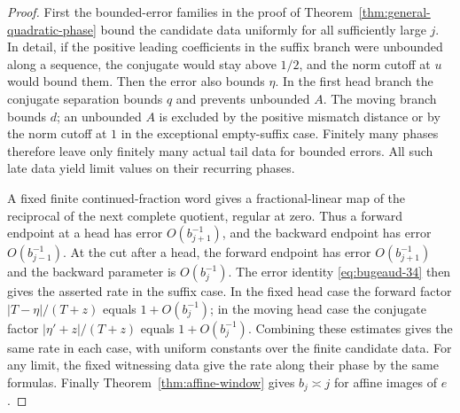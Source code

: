 \documentclass[11pt]{amsart}
\theoremstyle{definition}
\theoremstyle{remark}
\numberwithin{equation}{section}
\begin{document}
\begin{proof}
First the bounded-error families in the proof of
Theorem~\ref{thm:general-quadratic-phase} bound the candidate data
uniformly for all sufficiently large $j$. In detail, if the
positive leading coefficients in the suffix branch were unbounded
along a sequence, the conjugate would stay above $1/2$, and the
norm cutoff at $u$ would bound them. Then the error also bounds
$\eta$. In the first head branch the conjugate separation bounds
$q$ and prevents unbounded $A$. The moving branch bounds $d$;
an unbounded $A$ is excluded by the positive mismatch distance or
by the norm cutoff at $1$ in the exceptional empty-suffix case.
Finitely many phases therefore leave only finitely many actual
tail data for bounded errors. All such late data yield limit
values on their recurring phases.

A fixed finite continued-fraction word gives a fractional-linear
map of the reciprocal of the next complete quotient, regular at
zero. Thus a forward endpoint at a head has error
$O(b_{j+1}^{-1})$, and the backward endpoint has error
$O(b_{j-1}^{-1})$. At the cut after a head, the forward endpoint
has error $O(b_{j+1}^{-1})$ and the backward parameter is
$O(b_j^{-1})$. The error identity \eqref{eq:bugeaud-34}
then gives the asserted rate in the suffix case. In the fixed
head case the forward factor $|T-\eta|/(T+z)$ equals
$1+O(b_j^{-1})$; in the moving head case the conjugate factor
$|\eta'+z|/(T+z)$ equals $1+O(b_j^{-1})$. Combining these estimates
gives the same rate in each case, with uniform constants over the
finite candidate data. For any limit, the fixed witnessing data
give the rate along their phase by the same formulas.
Finally Theorem~\ref{thm:affine-window} gives $b_j\asymp j$
for affine images of $e$.
\end{proof}
\end{document}
